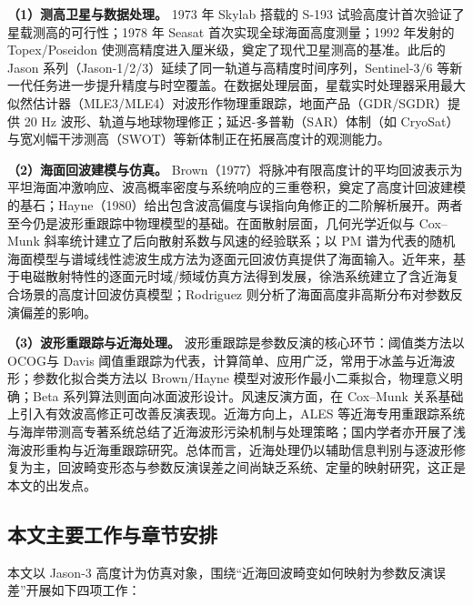 \documentclass[a4paper]{article}
\begin{document}
\textbf{（1）测高卫星与数据处理。} 1973 年 Skylab 搭载的 S-193 试验高度计首次验证了星载测高的可行性\cite{mcgoogan1974}；1978 年 Seasat 首次实现全球海面高度测量\cite{tapley1982}；1992 年发射的 Topex/Poseidon 使测高精度进入厘米级，奠定了现代卫星测高的基准\cite{fu1994}。此后的 Jason 系列（Jason-1/2/3）延续了同一轨道与高精度时间序列\cite{menard2003,beckley2010,zaouche2010}，Sentinel-3/6 等新一代任务进一步提升精度与时空覆盖\cite{donlon2012}。在数据处理层面，星载实时处理器采用最大似然估计器（MLE3/MLE4）对波形作物理重跟踪，地面产品（GDR/SGDR）提供 20 Hz 波形、轨道与地球物理修正\cite{chelton2001}；延迟-多普勒（SAR）体制（如 CryoSat）与宽刈幅干涉测高（SWOT）等新体制正在拓展高度计的观测能力\cite{raney1998,wingham2006,biancamaria2016}。

\textbf{（2）海面回波建模与仿真。} Brown（1977）将脉冲有限高度计的平均回波表示为平坦海面冲激响应、波高概率密度与系统响应的三重卷积，奠定了高度计回波建模的基石\cite{brown1977}；Hayne（1980）给出包含波高偏度与误指向角修正的二阶解析展开\cite{hayne1980}。两者至今仍是波形重跟踪中物理模型的基础。在面散射层面，几何光学近似与 Cox--Munk 斜率统计\cite{coxmunk1954}建立了后向散射系数与风速的经验联系；以 PM 谱为代表的随机海面模型\cite{pm1964}与谱域线性滤波生成方法\cite{thorsos1990}为逐面元回波仿真提供了海面输入。近年来，基于电磁散射特性的逐面元时域/频域仿真方法得到发展，徐浩系统建立了含近海复合场景的高度计回波仿真模型\cite{refpaper}；Rodriguez 则分析了海面高度非高斯分布对参数反演偏差的影响\cite{rodriguez1988}。

\textbf{（3）波形重跟踪与近海处理。} 波形重跟踪是参数反演的核心环节：阈值类方法以 OCOG\cite{wingham1986}与 Davis 阈值重跟踪\cite{davis1997}为代表，计算简单、应用广泛，常用于冰盖与近海波形；参数化拟合类方法以 Brown/Hayne 模型对波形作最小二乘拟合，物理意义明确；Beta 系列算法\cite{martin1983}则面向冰面波形设计。风速反演方面，在 Cox--Munk 关系基础上引入有效波高修正可改善反演表现\cite{lefevre1994}。近海方向上，ALES 等近海专用重跟踪系统\cite{deng2006}与海岸带测高专著\cite{vignudelli2011}系统总结了近海波形污染机制与处理策略；国内学者亦开展了浅海波形重构与近海重跟踪研究\cite{baolifeng2004,baolifeng2007,yangle2009,miyinxia2019,zhanyihua2021}。总体而言，近海处理仍以辅助信息判别与逐波形修复为主，回波畸变形态与参数反演误差之间尚缺乏系统、定量的映射研究，这正是本文的出发点。

\subsection{本文主要工作与章节安排}
\label{sec:outline}
本文以 Jason-3 高度计为仿真对象，围绕“近海回波畸变如何映射为参数反演误差”开展如下四项工作：
\end{document}
